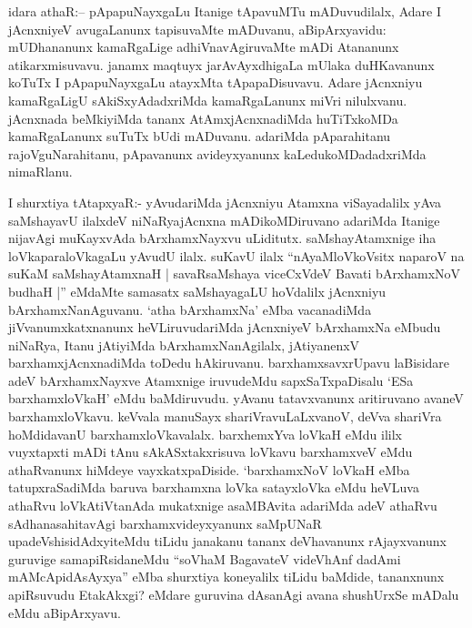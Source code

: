 
\begin{artha}
idara athaR:{\rm --} pApapuNayxgaLu Itanige tApavuMTu mADuvudilalx, Adare I jAcnxniyeV avugaLanunx tapisuvaMte mADuvanu, aBipArxyavidu: mUDhananunx kamaRgaLige adhiVnavAgiruvaMte mADi Atananunx atikarxmisuvavu. janamx maqtuyx jarAvAyxdhigaLa mUlaka duHKavanunx koTuTx I pApapuNayxgaLu atayxMta tApapaDisuvavu. Adare jAcnxniyu kamaRgaLigU sAkiSxyAdadxriMda kamaRgaLanunx miVri nilulxvanu. jAcnxnada beMkiyiMda tananx AtAmxjAcnxnadiMda huTiTxkoMDa kamaRgaLanunx suTuTx bUdi mADuvanu. adariMda pAparahitanu rajoVguNarahitanu, pApavanunx avideyxyanunx kaLedukoMDadadxriMda nimaRlanu.
\end{artha}


\begin{artha}
I shurxtiya tAtapxyaR:- yAvudariMda jAcnxniyu Atamxna viSayadalilx yAva saMshayavU ilalxdeV niNaRyajAcnxna mADikoMDiruvano adariMda Itanige nijavAgi muKayxvAda bArxhamxNayxvu uLiditutx. saMshayAtamxnige iha loVkaparaloVkagaLu yAvudU ilalx. suKavU ilalx ``nAyaMloVkoVsitx naparoV na suKaM saMshayAtamxnaH | savaRsaMshaya viceCxVdeV Bavati bArxhamxNoV budhaH |'' eMdaMte samasatx saMshayagaLU hoVdalilx jAcnxniyu bArxhamxNanAguvanu. `atha bArxhamxNa' eMba vacanadiMda jiVvanumxkatxnanunx heVLiruvudariMda jAcnxniyeV bArxhamxNa eMbudu niNaRya, Itanu jAtiyiMda bArxhamxNanAgilalx, jAtiyanenxV barxhamxjAcnxnadiMda toDedu hAkiruvanu. barxhamxsavxrUpavu laBisidare adeV bArxhamxNayxve Atamxnige iruvudeMdu sapxSaTxpaDisalu `ESa barxhamxloVkaH' eMdu baMdiruvudu. yAvanu tatavxvanunx aritiruvano avaneV barxhamxloVkavu. keVvala manuSayx shariVravuLaLxvanoV, deVva shariVra hoMdidavanU barxhamxloVkavalalx. barxhemxYva loVkaH eMdu ililx vuyxtapxti mADi tAnu sAkASxtakxrisuva loVkavu barxhamxveV eMdu athaRvanunx hiMdeye vayxkatxpaDiside. `barxhamxNoV loVkaH eMba tatupxraSadiMda baruva barxhamxna loVka satayxloVka eMdu heVLuva athaRvu loVkAtiVtanAda mukatxnige asaMBAvita adariMda adeV athaRvu sAdhanasahitavAgi barxhamxvideyxyanunx saMpUNaR upadeVshisidAdxyiteMdu tiLidu janakanu tananx deVhavanunx rAjayxvanunx guruvige samapiRsidaneMdu ``soV\s haM BagavateV videVhAnf dadAmi mAMcApidAsAyxya'' eMba shurxtiya koneyalilx tiLidu baMdide, tananxnunx apiRsuvudu EtakAkxgi? eMdare guruvina dAsanAgi avana shushUrxSe mADalu eMdu aBipArxyavu.
\end{artha}

